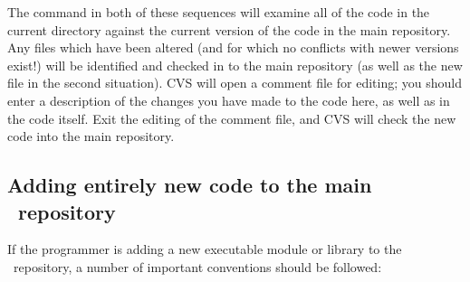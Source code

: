 The  command in both of these sequences will examine all of
the code in the current  directory against the current
version of the code in the main repository. Any files which have been
altered (and for which no conflicts with newer versions exist!) will be
identified and checked in to the main repository (as well as the new file
in the second situation).  CVS will open a comment file for editing; you
should enter a description of the changes you have made to the code here,
as well as in the code itself.  Exit the editing of the comment file,
and CVS will check the new code into the main repository.

\subsection{Adding entirely new code to the main \PSIthree\ repository} 
\label{checkin_new}

If the programmer is adding a new executable module or library to the
\PSIthree\ repository, a number of important conventions should be followed:

